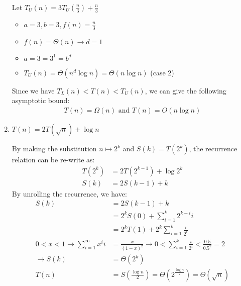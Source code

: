 \documentclass[11pt, a4paper, oneside]{memoir}
\begin{document}
\begin{enumerate}
    Let $T_U(n) = 3T_U(\frac{n}{3}) + \frac{n}{3}$
    \begin{itemize}
        \item $a = 3, b = 3, f(n) = \frac{n}{3}$
        \item $f(n) = \Theta(n) \rightarrow d = 1$
        \item $a = 3 = 3^1 = b^d$
        \item $T_U(n) = \Theta(n^d \log n) = \Theta(n \log n)$ (case 2)
    \end{itemize}
    Since we have $T_L(n) < T(n) < T_U(n)$, we can give the following asymptotic bound:
    \begin{align*}
        T(n) = \Omega(n) \text{ and } T(n) = O(n \log n)
    \end{align*}

    \item \textbf{$T(n) = 2T(\sqrt{n}) + \log n$}

    By making the substitution $n \mapsto 2^k$ and $S(k) = T(2^k)$, the recurrence relation can be re-write as:
    \begin{align*}
        T(2^k) &= 2T(2^{k-1}) + \log 2^k \\
        S(k) &= 2S(k-1) + k
    \end{align*}
    By unrolling the recurrence, we have:
    \begin{align*}
        S(k) &= 2S(k-1) + k \\
        &= 2^k S(0) + \sum_{i=1}^{k} 2^{k-i} i \\
        &= 2^k T(1) + 2^k \sum_{i=1}^{k} \frac{i}{2^i} \\
        0 < x < 1 \rightarrow \sum_{i=1}^{\infty} x^{i} i &= \frac{x}{(1-x)^2} \rightarrow 0 < \sum_{i=1}^{k} \frac{i}{2^i} < \frac{0.5}{0.5^2} = 2 \\
        \rightarrow S(k) &= \Theta(2^k) \\
        T(n) &= S(\frac{\log n}{2}) = \Theta(2^{\frac{\log n}{2}}) = \Theta(\sqrt{n})
    \end{align*}
\end{enumerate}
\end{document}
